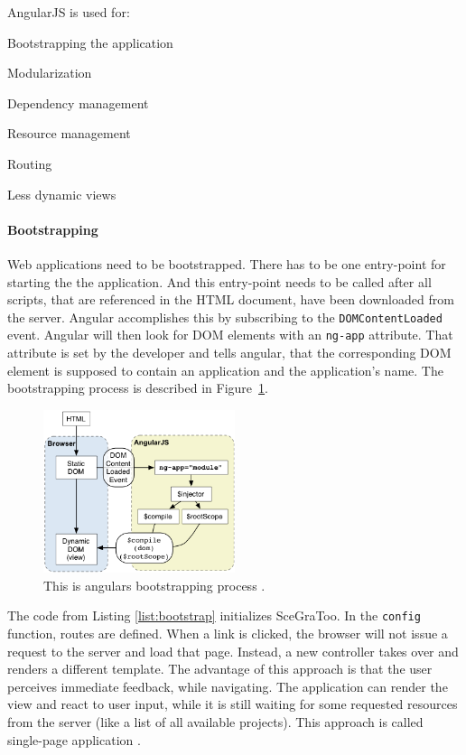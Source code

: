 AngularJS is used for:

\begin{itemize*}
  \item Bootstrapping the application
  \item Modularization
  \item Dependency management
  \item Resource management
  \item Routing
  \item Less dynamic views
\end{itemize*}

\paragraph{Bootstrapping}
\label{par:Bootstrapping and Routing}

Web applications need to be bootstrapped. There has to be one entry-point
for starting the the application. And this entry-point
needs to be called after all scripts, that are referenced in the \gls{HTML}
document, have been downloaded from the server. Angular accomplishes this by
subscribing to the \texttt{DOMContentLoaded} event. Angular will then look for
\gls{DOM} elements with an \texttt{ng-app} attribute. That attribute is set by the
developer and tells angular, that the corresponding DOM element is supposed to
contain an application and the application's name. The bootstrapping process is
described in Figure~\ref{fig:angularbootstrap}.

\begin{figure}
  \centering
  \includegraphics[width=0.5\textwidth]{../assets/concepts-startup.png}
  \caption{This is angulars bootstrapping process \cite{angularbootstrap}.}
  \label{fig:angularbootstrap}
\end{figure}

The code from Listing \ref{list:bootstrap} initializes SceGraToo. In the \texttt{config}
function, routes are defined. When a link is clicked, the browser will not issue a
request to the server and load that page. Instead, a new controller takes over and
renders a different template. The advantage of this approach is that the user
perceives immediate feedback, while navigating. The application can render the view and
react to user input, while it is still waiting for some requested resources from
the server (like a list of all available projects). This approach is called
single-page application \cite{Mikowski:2013:SPW:2663433}.

